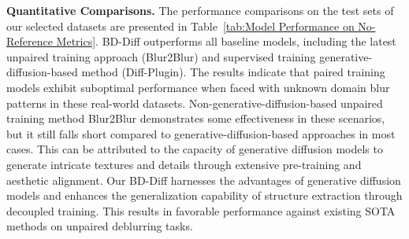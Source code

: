 \textbf{Quantitative Comparisons.} The performance comparisons on the test sets of our selected datasets are presented in Table~\ref{tab:Model Performance on No-Reference Metrics}. BD-Diff outperforms all baseline models, including the latest unpaired training approach (Blur2Blur) and supervised training generative-diffusion-based method (Diff-Plugin). The results indicate that paired training models exhibit suboptimal performance when faced with unknown domain blur patterns in these real-world datasets. Non-generative-diffusion-based unpaired training method Blur2Blur demonstrates some effectiveness in these scenarios, but it still falls short compared to generative-diffusion-based approaches in most cases. This can be attributed to the capacity of generative diffusion models to generate intricate textures and details through extensive pre-training and aesthetic alignment. Our BD-Diff harnesses the advantages of generative diffusion models and enhances the generalization capability of structure extraction through decoupled training. This results in favorable performance against existing SOTA methods on unpaired deblurring tasks.

